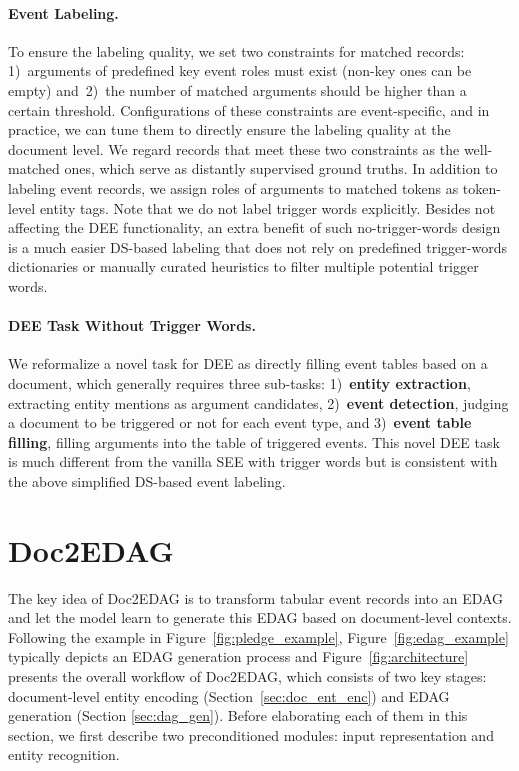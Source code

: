 \documentclass[11pt,a4paper]{article}
\begin{document}
\paragraph{Event Labeling.}
To ensure the labeling quality, we set two constraints for matched records: 1)~arguments of predefined key event roles must exist (non-key ones can be empty)
and~2)~the number of matched arguments should be higher than a certain threshold.
Configurations of these constraints are event-specific, and in practice, we can tune them to directly ensure the labeling quality at the document level.
We regard records that meet these two constraints as the well-matched ones, which serve as distantly supervised ground truths.
In addition to labeling event records, we assign roles of arguments to matched tokens as token-level entity tags.
Note that we do not label trigger words explicitly.
Besides not affecting the DEE functionality, an extra benefit of such no-trigger-words design is a much easier DS-based labeling that does not rely on predefined trigger-words dictionaries or manually curated heuristics to filter multiple potential trigger words.

\paragraph{DEE Task Without Trigger Words.}
We reformalize a novel task for DEE as directly filling event tables based on a document, which generally requires three sub-tasks:
1)~\textbf{entity extraction}, extracting entity mentions as argument candidates,
2)~\textbf{event detection}, judging a document to be triggered or not for each event type,
and 3)~\textbf{event table filling}, filling arguments into the table of triggered events.
This novel DEE task is much different from the vanilla SEE with trigger words but is consistent with the above simplified DS-based event labeling.




\section{Doc2EDAG}
The key idea of Doc2EDAG is to transform tabular event records into an EDAG and let the model learn to generate this EDAG based on document-level contexts.
Following the example in Figure~\ref{fig:pledge_example},
Figure~\ref{fig:edag_example} typically depicts an EDAG generation process and Figure~\ref{fig:architecture} presents the overall workflow of Doc2EDAG, which consists of two key stages: document-level entity encoding (Section~\ref{sec:doc_ent_enc}) and EDAG generation (Section \ref{sec:dag_gen}).
Before elaborating each of them in this section, we first describe two preconditioned modules: input representation and entity recognition.
\end{document}
